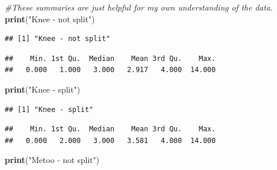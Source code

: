 \documentclass[]{article}
\newenvironment{Shaded}{\begin{snugshade}}{\end{snugshade}}
\newcommand{\KeywordTok}[1]{\textcolor[rgb]{0.13,0.29,0.53}{\textbf{#1}}}
\newcommand{\StringTok}[1]{\textcolor[rgb]{0.31,0.60,0.02}{#1}}
\newcommand{\CommentTok}[1]{\textcolor[rgb]{0.56,0.35,0.01}{\textit{#1}}}
\newcommand{\OperatorTok}[1]{\textcolor[rgb]{0.81,0.36,0.00}{\textbf{#1}}}
\newcommand{\NormalTok}[1]{#1}
\begin{document}
\begin{Shaded}
\begin{Highlighting}[]
\CommentTok{#These summaries are just helpful for my own understanding of the data.}
\KeywordTok{print}\NormalTok{(}\StringTok{"Knee - not split"}\NormalTok{)}
\end{Highlighting}
\end{Shaded}

\begin{verbatim}
## [1] "Knee - not split"
\end{verbatim}

\begin{Shaded}
\end{Shaded}

\begin{verbatim}
##    Min. 1st Qu.  Median    Mean 3rd Qu.    Max. 
##   0.000   1.000   3.000   2.917   4.000  14.000
\end{verbatim}

\begin{Shaded}
\begin{Highlighting}[]
\KeywordTok{print}\NormalTok{(}\StringTok{"Knee - split"}\NormalTok{)}
\end{Highlighting}
\end{Shaded}

\begin{verbatim}
## [1] "Knee - split"
\end{verbatim}

\begin{Shaded}
\end{Shaded}

\begin{verbatim}
##    Min. 1st Qu.  Median    Mean 3rd Qu.    Max. 
##   0.000   2.000   3.000   3.581   4.000  14.000
\end{verbatim}

\begin{Shaded}
\begin{Highlighting}[]
\KeywordTok{print}\NormalTok{(}\StringTok{"Metoo - not split"}\NormalTok{)}
\end{Highlighting}
\end{Shaded}
\end{document}
